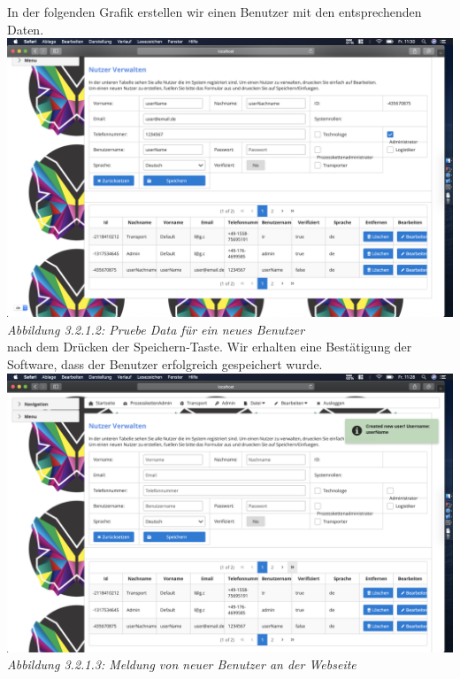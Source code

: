 \documentclass[enabledeprecatedfontcommands,fontsize=12pt,paper=a4,twoside]{scrartcl}
\begin{document}
In der folgenden Grafik erstellen wir einen Benutzer mit den entsprechenden Daten.
\hypertarget{sc3.1.2.2}{
\includegraphics[width=1\textwidth]{Screenshots/userErzeugungInitialData.png}
\textit{Abbildung 3.2.1.2: Pruebe Data für ein neues Benutzer}
} \\
nach dem Drücken der Speichern-Taste. Wir erhalten eine Bestätigung der Software, dass der Benutzer erfolgreich gespeichert wurde.
\hypertarget{sc3.1.2.3}{
\includegraphics[width=1\textwidth]{Screenshots/userErzeugenMeldung.png}
\textit{Abbildung 3.2.1.3: Meldung von neuer Benutzer an der Webseite}
} \\
\end{document}
